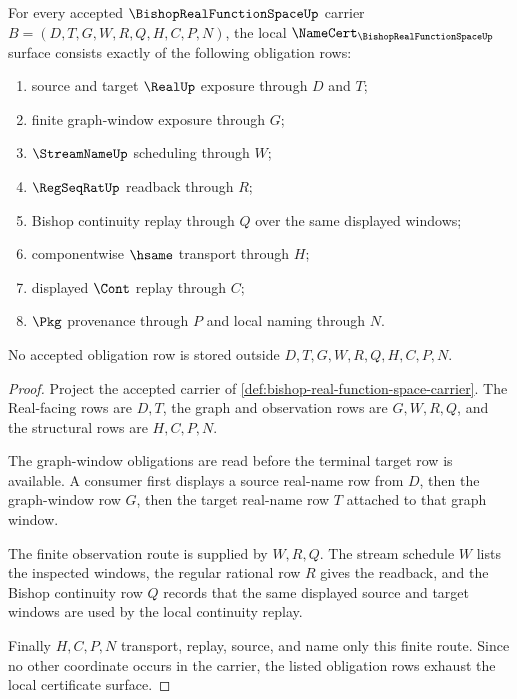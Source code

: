 \begin{theorem}\label{thm:bishop-real-function-space-namecert-obligations}
For every accepted $\BishopRealFunctionSpaceUp$ carrier $B=(D,T,G,W,R,Q,H,C,P,N)$, the local $\NameCert_{\BishopRealFunctionSpaceUp}$ surface consists exactly of the following obligation rows:
\begin{enumerate}
\item source and target $\RealUp$ exposure through $D$ and $T$;
\item finite graph-window exposure through $G$;
\item $\StreamNameUp$ scheduling through $W$;
\item $\RegSeqRatUp$ readback through $R$;
\item Bishop continuity replay through $Q$ over the same displayed windows;
\item componentwise $\hsame$ transport through $H$;
\item displayed $\Cont$ replay through $C$;
\item $\Pkg$ provenance through $P$ and local naming through $N$.
\end{enumerate}
No accepted obligation row is stored outside $D,T,G,W,R,Q,H,C,P,N$.
\end{theorem}
\begin{proof}
Project the accepted carrier of \autoref{def:bishop-real-function-space-carrier}. The Real-facing rows are $D,T$, the graph and observation rows are $G,W,R,Q$, and the structural rows are $H,C,P,N$.

The graph-window obligations are read before the terminal target row is available. A consumer first displays a source real-name row from $D$, then the graph-window row $G$, then the target real-name row $T$ attached to that graph window.

The finite observation route is supplied by $W,R,Q$. The stream schedule $W$ lists the inspected windows, the regular rational row $R$ gives the readback, and the Bishop continuity row $Q$ records that the same displayed source and target windows are used by the local continuity replay.

Finally $H,C,P,N$ transport, replay, source, and name only this finite route. Since no other coordinate occurs in the carrier, the listed obligation rows exhaust the local certificate surface.
\end{proof}

